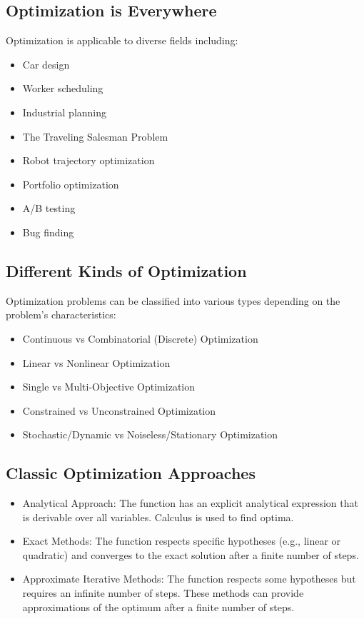 \subsection*{Optimization is Everywhere}
Optimization is applicable to diverse fields including:
\begin{itemize}
    \item Car design
    \item Worker scheduling
    \item Industrial planning
    \item The Traveling Salesman Problem
    \item Robot trajectory optimization
    \item Portfolio optimization
    \item A/B testing
    \item Bug finding
\end{itemize}
\subsection*{Different Kinds of Optimization}
Optimization problems can be classified into various types depending on the problem's characteristics:
\begin{itemize}
    \item  Continuous vs Combinatorial (Discrete) Optimization
    \item  Linear vs Nonlinear Optimization
    \item  Single vs Multi-Objective Optimization
    \item  Constrained vs Unconstrained Optimization
    \item  Stochastic/Dynamic vs Noiseless/Stationary Optimization
\end{itemize}

\subsection*{Classic Optimization Approaches}
\begin{itemize}
    \item  Analytical Approach: The function has an explicit analytical expression that is derivable over all variables. Calculus is used to find optima.
    \item  Exact Methods: The function respects specific hypotheses (e.g., linear or quadratic) and converges to the exact solution after a finite number of steps.
    \item  Approximate Iterative Methods: The function respects some hypotheses but requires an infinite number of steps. These methods can provide approximations of the optimum after a finite number of steps.
\end{itemize}

